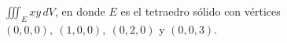 \item $\iiint_E xy \, dV$, en donde $E$ es el tetraedro sólido con vértices $(0, 0, 0), \ (1, 0, 0), \ (0, 2, 0)$ y $(0, 0, 3)$.
